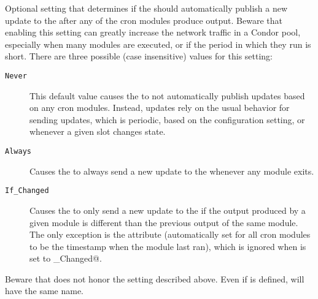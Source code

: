 \begin{description}
\label{param:StartdCronAutopublish}
\item[\Macro{STARTD\_CRON\_AUTOPUBLISH}]
  Optional setting that determines if the  should
  automatically publish a new update to the  after
  any of the cron modules produce output.
  Beware that enabling this setting can greatly increase the network
  traffic in a Condor pool, especially when many modules are
  executed, or if the period in which they run is short.
  There are three possible (case insensitive) values for this
  setting: 
  \begin{description}
     \item[\texttt{Never}] This default value causes the
      to not automatically publish updates based on
     any cron modules. Instead, updates rely on the usual behavior for sending
     updates, which is periodic, based on the 
     configuration setting, or whenever a given slot
     changes state.
     \item[\texttt{Always}] Causes the  to always send a new
     update to the  whenever any module exits.
     \item[\texttt{If\_Changed}] Causes the  to only send a
     new update to the  if the output produced by a
     given module is different than the previous output of the
     same module.
     The only exception is the  attribute
     (automatically set for all cron modules to be the timestamp when
     the module last ran), which is ignored when
      is set to \verb@If_Changed@.
  \end{description}
  Beware that  does not honor the
   setting described above.
  Even if  is defined,
   will have the same name.

\end{description}

